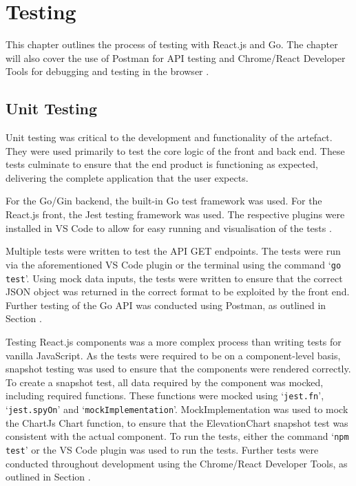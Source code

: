 \chapter{Testing}
\label{chap:testing}

This chapter outlines the process of testing with React.js and Go. The chapter will also cover the use of Postman for API testing  and Chrome/React Developer Tools for debugging and testing in the browser .

\section{Unit Testing}
\label{testing:unit}

Unit testing was critical to the development and functionality of the artefact. They were used primarily to test the core logic of the front and back end. These tests culminate to ensure that the end product is functioning as expected, delivering the complete application that the user expects.

For the Go/Gin backend, the built-in Go test framework was used. For the React.js front, the Jest testing framework was used. The respective plugins were installed in VS Code to allow for easy running and visualisation of the tests .

Multiple tests were written to test the API GET endpoints. The tests were run via the aforementioned VS Code plugin or the terminal using the command `\texttt{go test}'. Using mock data inputs, the tests were written to ensure that the correct JSON object was returned in the correct format to be exploited by the front end. Further testing of the Go API was conducted using Postman, as outlined in Section .

Testing React.js components was a more complex process than writing tests for vanilla JavaScript. As the tests were required to be on a component-level basis, snapshot testing was used to ensure that the components were rendered correctly. To create a snapshot test, all data required by the component was mocked, including required functions. These functions were mocked using `\texttt{jest.fn}', `\texttt{jest.spyOn}' and `\texttt{mockImplementation}'. MockImplementation was used to mock the ChartJs Chart function, to ensure that the ElevationChart snapshot test was consistent with the actual component. To run the tests, either the command `\texttt{npm test}' or the VS Code plugin was used to run the tests. Further tests were conducted throughout development using the Chrome/React Developer Tools, as outlined in Section .

